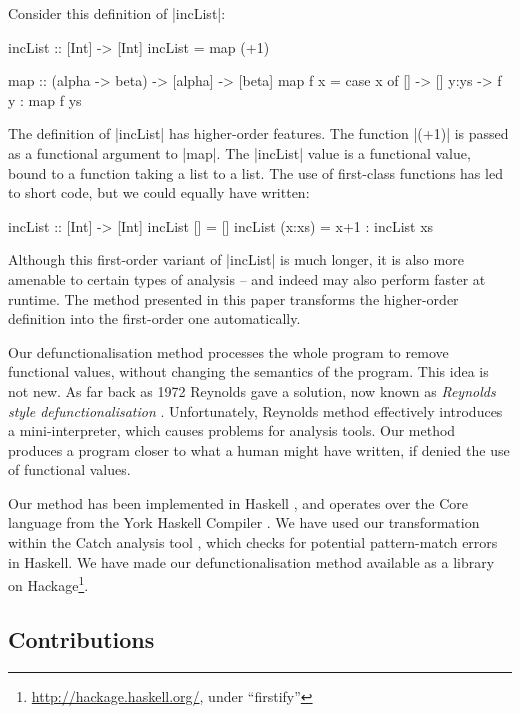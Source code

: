 \documentclass[preprint]{sigplanconf}
\begin{document}
\begin{example}
\label{ex:incList}

Consider this definition of |incList|:

\begin{code}
incList :: [Int] -> [Int]
incList = map (+1)

map :: (alpha -> beta) -> [alpha] -> [beta]
map f x = case  x of
                []    -> []
                y:ys  -> f y : map f ys
\end{code}

The definition of |incList| has higher-order features. The function |(+1)| is passed as a functional argument to |map|. The |incList| value is a functional value, bound to a function taking a list to a list. The use of first-class functions has led to short code, but we could equally have written:

\begin{code}
incList :: [Int] -> [Int]
incList []      = []
incList (x:xs)  = x+1 : incList xs
\end{code}

Although this first-order variant of |incList| is much longer, it is also more amenable to certain types of analysis -- and indeed may also perform faster at runtime. The method presented in this paper transforms the higher-order definition into the first-order one automatically.
\end{example}

Our defunctionalisation method processes the whole program to remove functional values, without changing the semantics of the program. This idea is not new. As far back as 1972 Reynolds gave a solution, now known as \textit{Reynolds style defunctionalisation} \cite{reynolds:defunc}. Unfortunately, Reynolds method effectively introduces a mini-interpreter, which causes problems for analysis tools. Our method produces a program closer to what a human might have written, if denied the use of functional values.

Our method has been implemented in Haskell \cite{haskell}, and operates over the Core language from the York Haskell Compiler \cite{me:yhc_core}. We have used our transformation within the Catch analysis tool \cite{me:catch_icfp}, which checks for potential pattern-match errors in Haskell. We have made our defunctionalisation method available as a library on Hackage\footnote{\url{http://hackage.haskell.org/}, under ``firstify''}.

\subsection{Contributions}
\end{document}
